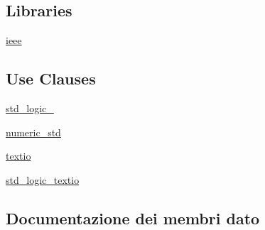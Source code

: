 \subsection*{Libraries}
 \begin{DoxyCompactItemize}
\item 
\hyperlink{classautomatic__tb_a0a6af6eef40212dbaf130d57ce711256}{ieee} 
\end{DoxyCompactItemize}
\subsection*{Use Clauses}
 \begin{DoxyCompactItemize}
\item 
\hyperlink{classautomatic__tb_acd03516902501cd1c7296a98e22c6fcb}{std\+\_\+logic\+\_}   
\item 
\hyperlink{classautomatic__tb_a2edc34402b573437d5f25fa90ba4013e}{numeric\+\_\+std}   
\item 
\hyperlink{classautomatic__tb_aa8c4e25998323a84db5b1fa701b92fcb}{textio}   
\item 
\hyperlink{classautomatic__tb_abc7d7fc2675847e1d861e3fda2b1990c}{std\+\_\+logic\+\_\+textio}   
\end{DoxyCompactItemize}


\subsection{Documentazione dei membri dato}
\subsubsection[{\texorpdfstring{ieee}{ieee}}]{\hspace{0.3cm}{\ttfamily [Library]}}\hypertarget{classautomatic__tb_a0a6af6eef40212dbaf130d57ce711256}{}\label{classautomatic__tb_a0a6af6eef40212dbaf130d57ce711256}
\subsubsection[{\texorpdfstring{numeric\+\_\+std}{numeric_std}}]{\hspace{0.3cm}{\ttfamily [Package]}}\hypertarget{classautomatic__tb_a2edc34402b573437d5f25fa90ba4013e}{}\label{classautomatic__tb_a2edc34402b573437d5f25fa90ba4013e}
